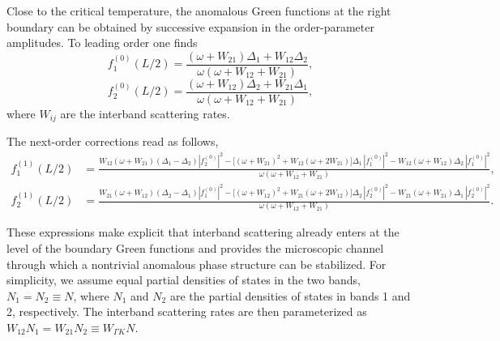 \documentclass[twocolumn,secnumarabic,amssymb, nobibnotes, aps, prl, superscriptaddress]{revtex4-2}
\begin{document}
Close to the critical temperature, the anomalous Green functions at the right boundary can be obtained by successive expansion in the order-parameter amplitudes. To leading order one finds
\begin{equation}
f_1^{(0)}(L/2)=
\frac{(\omega+W_{21})\Delta_1+W_{12}\Delta_2}
{\omega(\omega+W_{12}+W_{21})},
\label{eq:f10_SI}
\end{equation}
\begin{equation}
f_2^{(0)}(L/2)=
\frac{(\omega+W_{12})\Delta_2+W_{21}\Delta_1}
{\omega(\omega+W_{12}+W_{21})},
\label{eq:f20_SI}
\end{equation}
where $W_{ij}$ are the interband scattering rates.

The next-order corrections read as follows,
\begin{align}
f_1^{(1)}(L/2) &=
\frac{
W_{12}(\omega+W_{21})(\Delta_1-\Delta_2)|f_2^{(0)}|^2
-
\Big[
(\omega+W_{21})^2+W_{12}(\omega+2W_{21})
\Big]\Delta_1\,|f_1^{(0)}|^2
-
W_{12}(\omega+W_{12})\Delta_2\,|f_1^{(0)}|^2
}
{\omega(\omega+W_{12}+W_{21})},
\label{eq:f11_SI}
\\[1ex]
f_2^{(1)}(L/2) &=
\frac{
W_{21}(\omega+W_{12})(\Delta_2-\Delta_1)|f_1^{(0)}|^2
-
\Big[
(\omega+W_{12})^2+W_{21}(\omega+2W_{12})
\Big]\Delta_2\,|f_2^{(0)}|^2
-
W_{21}(\omega+W_{21})\Delta_1\,|f_2^{(0)}|^2
}
{\omega(\omega+W_{12}+W_{21})}.
\label{eq:f21_SI}
\end{align}

These expressions make explicit that interband scattering already enters at the level of the boundary Green functions and provides the microscopic channel through which a nontrivial anomalous phase structure can be stabilized. For simplicity, we assume equal partial densities of states in the two bands, \(N_1=N_2\equiv N\), where \(N_1\) and \(N_2\) are the partial densities of states in bands 1 and 2, respectively. The interband scattering rates are then parameterized as \(W_{12}N_1 = W_{21}N_2 \equiv W_{\Gamma K}N\).
\end{document}

